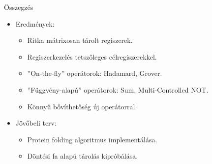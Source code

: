 \documentclass[aspectratio=169]{beamer}
\begin{document}
\begin{frame}{Összegzés}

\begin{itemize}
\item Eredmények:
\begin{itemize}
    \item Ritka mátrixosan tárolt regiszerek.
    \item Regiszerkezelés tetszőleges célregiszerekkel.
    \item ''On-the-fly'' operátorok: Hadamard, Grover.
    \item ''Függvény-alapú'' operátorok: Sum, Multi-Controlled NOT.
    \item Könnyű bővíthetőség új operátorral.
\end{itemize}
\item Jövőbeli terv:
\begin{itemize}
    \item Protein folding algoritmus implementálása.
    \item Döntési fa alapú tárolás kipróbálása.
\end{itemize}
\end{itemize}

\end{frame}
\end{document}
